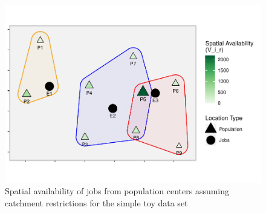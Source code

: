 \documentclass[]{elsarticle} %
\begin{document}
\begin{figure}
\includegraphics[width=1\linewidth]{Spatial-Availability_files/figure-latex/toy-example-availability-with-catchments-1} \caption{\label{fig:toy-example-availability-with-catchments}Spatial availability of jobs from population centers assuming catchment restrictions for the simple toy data set}\label{fig:toy-example-availability-with-catchments}
\end{figure}
\end{document}
